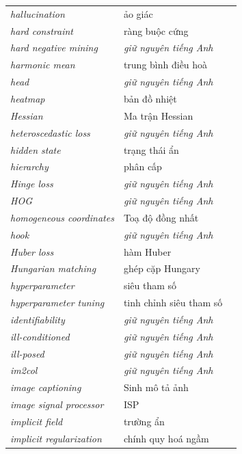 \documentclass[deep_learning.tex]{subfiles}
\begin{document}
\begin{longtable}{@{}L{5.2cm}L{5.9cm}L{2.6cm}@{}}
\emph{hallucination} & ảo giác & \\
\emph{hard constraint} & ràng buộc cứng & \\
\emph{hard negative mining} & \emph{\color{tiercol}giữ nguyên tiếng Anh} & \\
\emph{harmonic mean} & trung bình điều hoà & \\
\emph{head} & \emph{\color{tiercol}giữ nguyên tiếng Anh} & \\
\emph{heatmap} & bản đồ nhiệt & \\
\emph{Hessian} & Ma trận Hessian & \\
\emph{heteroscedastic loss} & \emph{\color{tiercol}giữ nguyên tiếng Anh} & \\
\emph{hidden state} & trạng thái ẩn & \\
\emph{hierarchy} & phân cấp & \\
\emph{Hinge loss} & \emph{\color{tiercol}giữ nguyên tiếng Anh} & \\
\emph{HOG} & \emph{\color{tiercol}giữ nguyên tiếng Anh} & \\
\emph{homogeneous coordinates} & Toạ độ đồng nhất & \\
\emph{hook} & \emph{\color{tiercol}giữ nguyên tiếng Anh} & \\
\emph{Huber loss} & hàm Huber & \\
\emph{Hungarian matching} & ghép cặp Hungary & \\
\emph{hyperparameter} & siêu tham số & \\
\emph{hyperparameter tuning} & tinh chỉnh siêu tham số & \\
\emph{identifiability} & \emph{\color{tiercol}giữ nguyên tiếng Anh} & \\
\emph{ill-conditioned} & \emph{\color{tiercol}giữ nguyên tiếng Anh} & \\
\emph{ill-posed} & \emph{\color{tiercol}giữ nguyên tiếng Anh} & \\
\emph{im2col} & \emph{\color{tiercol}giữ nguyên tiếng Anh} & \\
\emph{image captioning} & Sinh mô tả ảnh & \\
\emph{image signal processor} & ISP & \\
\emph{implicit field} & trường ẩn & \\
\emph{implicit regularization} & chính quy hoá ngầm & \\

\end{longtable}
\end{document}
